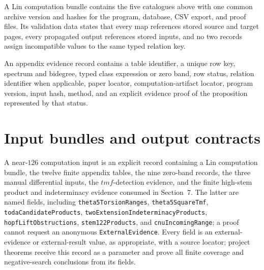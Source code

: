\begin{definition}
  \label{def:lin-computation-bundle}
  \notready
  A Lin computation bundle contains the five catalogues above with one common
  archive version and hashes for the program, database, CSV export, and proof
  files.  Its validation data states that every map references stored source
  and target pages, every propagated output references stored inputs, and no
  two records assign incompatible values to the same typed relation key.
\end{definition}

\begin{definition}
  \label{def:appendix-evidence-record}
  \notready
  An appendix evidence record contains a table identifier, a unique row key,
  spectrum and bidegree, typed class expression or zero band, row status,
  relation identifier when applicable, paper locator, computation-artifact
  locator, program version, input hash, method, and an explicit evidence proof
  of the proposition represented by that status.
\end{definition}

\section{Input bundles and output contracts}

\begin{definition}
  \label{def:near126-computation-input}
  \notready
  A near-$126$ computation input is an explicit record containing a Lin
  computation bundle, the twelve finite appendix tables, the nine zero-band
  records, the three manual differential inputs, the $tmf$-detection evidence,
  and the finite high-stem product and indeterminacy evidence consumed in
  Section~7.  The latter are named fields, including
  \texttt{theta5TorsionRanges}, \texttt{theta5SquareTmf},
  \texttt{todaCandidateProducts},
  \texttt{twoExtensionIndeterminacyProducts},
  \texttt{hopfLiftObstructions}, \texttt{stem122Products}, and
  \texttt{cnuIncomingRange}; a proof cannot request an anonymous
  \texttt{ExternalEvidence}.  Every field is an external-evidence or
  external-result value, as
  appropriate, with a source locator; project theorems receive this record as a
  parameter and prove all finite coverage and negative-search conclusions from
  its fields.
\end{definition}

